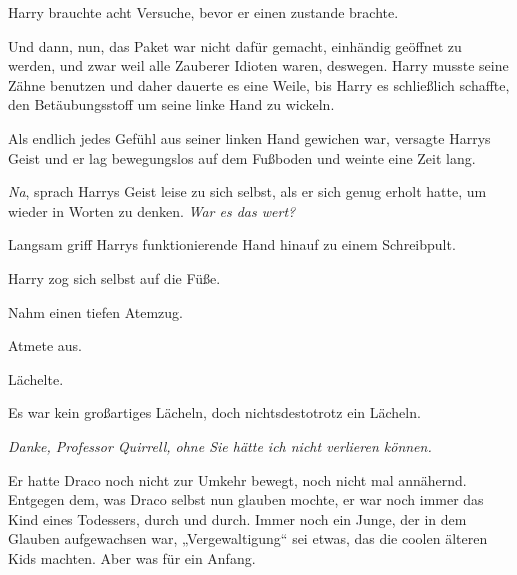 Harry brauchte acht Versuche, bevor er einen  zustande brachte.

Und dann, nun, das Paket war nicht dafür gemacht, einhändig geöffnet zu werden, und zwar weil alle Zauberer Idioten waren, deswegen. Harry musste seine Zähne benutzen und daher dauerte es eine Weile, bis Harry es schließlich schaffte, den Betäubungsstoff um seine linke Hand zu wickeln.

Als endlich jedes Gefühl aus seiner linken Hand gewichen war, versagte Harrys Geist und er lag bewegungslos auf dem Fußboden und weinte eine Zeit lang.

\emph{Na}, sprach Harrys Geist leise zu sich selbst, als er sich genug erholt hatte, um wieder in Worten zu denken. \emph{War es das wert?}

Langsam griff Harrys funktionierende Hand hinauf zu einem Schreibpult.

Harry zog sich selbst auf die Füße.

Nahm einen tiefen Atemzug.

Atmete aus.

Lächelte.

Es war kein großartiges Lächeln, doch nichtsdestotrotz ein Lächeln.

\emph{Danke, Professor Quirrell, ohne Sie hätte ich nicht verlieren können.}

Er hatte Draco noch nicht zur Umkehr bewegt, noch nicht mal annähernd. Entgegen dem, was Draco selbst nun glauben mochte, er war noch immer das Kind eines Todessers, durch und durch. Immer noch ein Junge, der in dem Glauben aufgewachsen war, „Vergewaltigung“ sei etwas, das die coolen älteren Kids machten. Aber was für ein Anfang.

